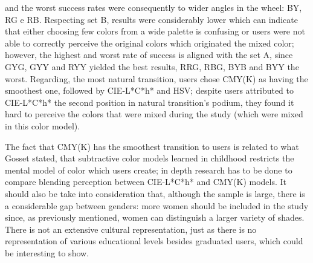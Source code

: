 and the worst success rates were consequently to wider angles in the wheel: BY, RG e RB.
Respecting set B, results were considerably lower which can indicate that either choosing few colors from
a wide palette is confusing or users were not able to correctly perceive the original colors which originated
the mixed color; however, the highest and worst rate of success is aligned with the set A, since GYG, GYY
and RYY yielded the best results, RRG, RBG, BYB and BYY the worst. Regarding, the most natural transition,
users chose CMY(K) as having the smoothest one, followed by CIE-L*C*h* and HSV; despite users attributed to
CIE-L*C*h* the second position in natural transition’s podium, they found it hard to perceive the colors
that were mixed during the study (which were mixed in this color model). \par
The fact that CMY(K) has the smoothest transition to users is related to what Gosset \cite{Gossett2004} stated, that
subtractive color models learned in childhood restricts the mental model of color which users create;
in depth research has to be done to compare blending perception between CIE-L*C*h* and CMY(K) models. It
should also be take into consideration that, although the sample is large, there is a considerable gap
between genders: more women should be included in the study since, as previously mentioned, women can
distinguish a larger variety of shades. There is not an extensive cultural representation, just as there
is no representation of various educational levels besides graduated users, which could be interesting to show. \par
%
